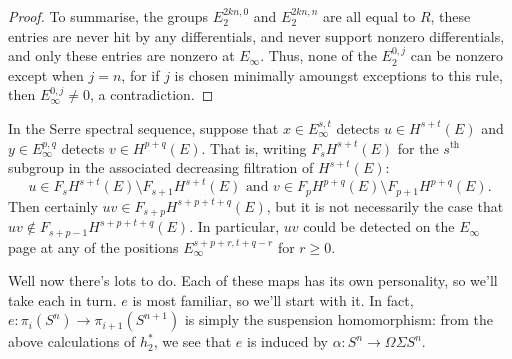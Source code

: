 \begin{proof}
To summarise, the groups $E_2^{2kn,0}$ and $E_2^{2kn,n}$ are all equal to $R$, these entries are never hit by any differentials, and never support nonzero differentials, and only these entries are nonzero at $E_\infty$. Thus, none of the $E_2^{0,j}$ can be nonzero except when $j=n$, for if $j$ is chosen minimally amoungst exceptions to this rule, then $E_\infty^{0,j}\neq0$, a contradiction.
%
%
%
\end{proof}
\begin{subtlety}\label{EinftyProductSubtlety}
In the Serre spectral sequence, suppose that $x\in E^{s,t}_\infty$ detects $u\in H^{s+t}(E)$ and $y\in E^{p,q}_\infty$ detects $v\in H^{p+q}(E)$. That is, writing $F_sH^{s+t}(E)$ for the $s^\text{th}$ subgroup in the associated decreasing filtration of $H^{s+t}(E)$:
\[u\in F_sH^{s+t}(E)\setminus F_{s+1}H^{s+t}(E)\text{ and }v\in F_pH^{p+q}(E)\setminus F_{p+1}H^{p+q}(E).\]
Then certainly $uv\in F_{s+p}H^{s+p+t+q}(E)$, but it is not necessarily the case that $uv\notin F_{s+p-1}H^{s+p+t+q}(E)$. In particular, $uv$ could be detected on the $E_\infty$ page at any of the positions $E_\infty^{s+p+r,t+q-r}$ for $r\geq0$.
\end{subtlety}

Well now there's lots to do.  Each of these maps has its own personality, so we'll take each in turn.  $e$ is most familiar, so we'll start with it. In fact, $e:\pi_i(S^n)\to\pi_{i+1}(S^{n+1})$ is simply the suspension homomorphism: from the above calculations of $h_2^*$, we see that $e$ is induced by $\alpha:S^n\to \Omega\Sigma S^n$.

